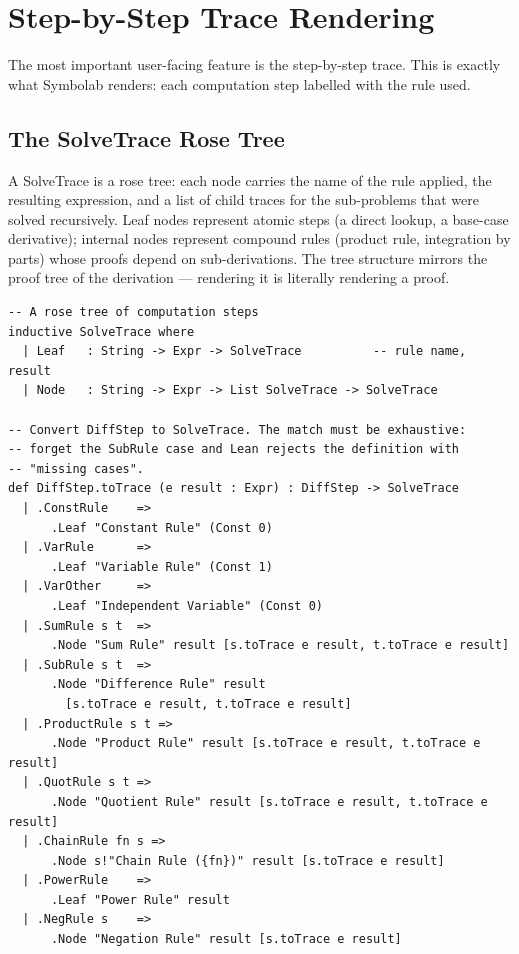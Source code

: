 \documentclass[12pt, openany]{book}
\theoremstyle{plain}
\theoremstyle{definition}
\theoremstyle{remark}
\newcommand{\li}[1]{{\ttfamily\small\color{tealaccent}#1}}
\begin{document}
\chapter{Step-by-Step Trace Rendering}
\color{black}

The most important user-facing feature is the step-by-step trace.  This is exactly
what Symbolab renders: each computation step labelled with the rule used.

\section{The \li{SolveTrace} Rose Tree}

A \li{SolveTrace} is a rose tree: each node carries the name of the rule applied, the resulting expression, and a list of child traces for the sub-problems that were solved recursively.  Leaf nodes represent atomic steps (a direct lookup, a base-case derivative); internal nodes represent compound rules (product rule, integration by parts) whose proofs depend on sub-derivations.  The tree structure mirrors the proof tree of the derivation --- rendering it is literally rendering a proof.

\begin{leanbox}
\begin{lstlisting}
-- A rose tree of computation steps
inductive SolveTrace where
  | Leaf   : String -> Expr -> SolveTrace          -- rule name, result
  | Node   : String -> Expr -> List SolveTrace -> SolveTrace

-- Convert DiffStep to SolveTrace. The match must be exhaustive:
-- forget the SubRule case and Lean rejects the definition with
-- "missing cases".
def DiffStep.toTrace (e result : Expr) : DiffStep -> SolveTrace
  | .ConstRule    =>
      .Leaf "Constant Rule" (Const 0)
  | .VarRule      =>
      .Leaf "Variable Rule" (Const 1)
  | .VarOther     =>
      .Leaf "Independent Variable" (Const 0)
  | .SumRule s t  =>
      .Node "Sum Rule" result [s.toTrace e result, t.toTrace e result]
  | .SubRule s t  =>
      .Node "Difference Rule" result
        [s.toTrace e result, t.toTrace e result]
  | .ProductRule s t =>
      .Node "Product Rule" result [s.toTrace e result, t.toTrace e result]
  | .QuotRule s t =>
      .Node "Quotient Rule" result [s.toTrace e result, t.toTrace e result]
  | .ChainRule fn s =>
      .Node s!"Chain Rule ({fn})" result [s.toTrace e result]
  | .PowerRule    =>
      .Leaf "Power Rule" result
  | .NegRule s    =>
      .Node "Negation Rule" result [s.toTrace e result]
\end{lstlisting}
\end{leanbox}
\color{black}
\end{document}
